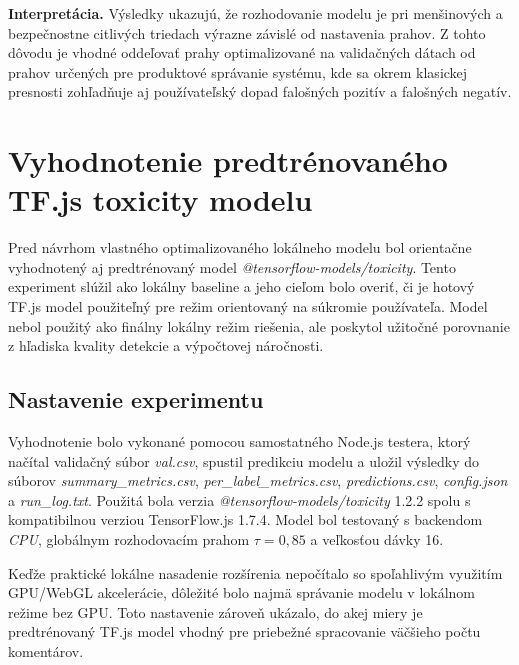 \textbf{Interpretácia.} Výsledky ukazujú, že rozhodovanie modelu je pri menšinových a bezpečnostne citlivých triedach výrazne závislé od nastavenia prahov. Z tohto dôvodu je vhodné oddeľovať prahy optimalizované na validačných dátach od prahov určených pre produktové správanie systému, kde sa okrem klasickej presnosti zohľadňuje aj používateľský dopad falošných pozitív a falošných negatív.

\section{Vyhodnotenie predtrénovaného TF.js toxicity modelu}

Pred návrhom vlastného optimalizovaného lokálneho modelu bol orientačne vyhodnotený aj predtrénovaný model \emph{@tensorflow-models/toxicity}. Tento experiment slúžil ako lokálny baseline a jeho cieľom bolo overiť, či je hotový TF.js model použiteľný pre režim orientovaný na súkromie používateľa. Model nebol použitý ako finálny lokálny režim riešenia, ale poskytol užitočné porovnanie z hľadiska kvality detekcie a výpočtovej náročnosti.

\subsection{Nastavenie experimentu}

Vyhodnotenie bolo vykonané pomocou samostatného Node.js testera, ktorý načítal validačný súbor \emph{val.csv}, spustil predikciu modelu a uložil výsledky do súborov \emph{summary\_metrics.csv}, \emph{per\_label\_metrics.csv}, \emph{predictions.csv}, \emph{config.json} a \emph{run\_log.txt}. Použitá bola verzia \emph{@tensorflow-models/toxicity} 1.2.2 spolu s kompatibilnou verziou TensorFlow.js 1.7.4. Model bol testovaný s backendom \emph{CPU}, globálnym rozhodovacím prahom $\tau = 0{,}85$ a veľkosťou dávky 16.

Keďže praktické lokálne nasadenie rozšírenia nepočítalo so spoľahlivým využitím GPU/WebGL akcelerácie, dôležité bolo najmä správanie modelu v lokálnom režime bez GPU. Toto nastavenie zároveň ukázalo, do akej miery je predtrénovaný TF.js model vhodný pre priebežné spracovanie väčšieho počtu komentárov.

